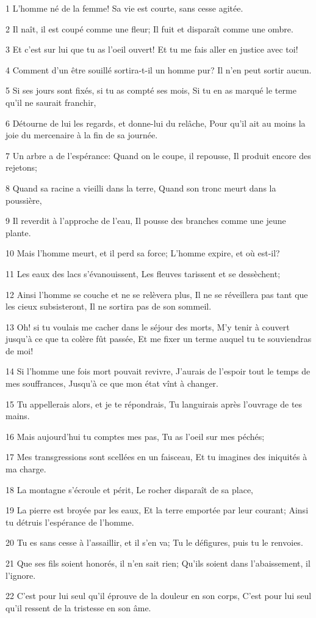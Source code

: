 \par 1 L'homme né de la femme! Sa vie est courte, sans cesse agitée.
\par 2 Il naît, il est coupé comme une fleur; Il fuit et disparaît comme une ombre.
\par 3 Et c'est sur lui que tu as l'oeil ouvert! Et tu me fais aller en justice avec toi!
\par 4 Comment d'un être souillé sortira-t-il un homme pur? Il n'en peut sortir aucun.
\par 5 Si ses jours sont fixés, si tu as compté ses mois, Si tu en as marqué le terme qu'il ne saurait franchir,
\par 6 Détourne de lui les regards, et donne-lui du relâche, Pour qu'il ait au moins la joie du mercenaire à la fin de sa journée.
\par 7 Un arbre a de l'espérance: Quand on le coupe, il repousse, Il produit encore des rejetons;
\par 8 Quand sa racine a vieilli dans la terre, Quand son tronc meurt dans la poussière,
\par 9 Il reverdit à l'approche de l'eau, Il pousse des branches comme une jeune plante.
\par 10 Mais l'homme meurt, et il perd sa force; L'homme expire, et où est-il?
\par 11 Les eaux des lacs s'évanouissent, Les fleuves tarissent et se dessèchent;
\par 12 Ainsi l'homme se couche et ne se relèvera plus, Il ne se réveillera pas tant que les cieux subsisteront, Il ne sortira pas de son sommeil.
\par 13 Oh! si tu voulais me cacher dans le séjour des morts, M'y tenir à couvert jusqu'à ce que ta colère fût passée, Et me fixer un terme auquel tu te souviendras de moi!
\par 14 Si l'homme une fois mort pouvait revivre, J'aurais de l'espoir tout le temps de mes souffrances, Jusqu'à ce que mon état vînt à changer.
\par 15 Tu appellerais alors, et je te répondrais, Tu languirais après l'ouvrage de tes mains.
\par 16 Mais aujourd'hui tu comptes mes pas, Tu as l'oeil sur mes péchés;
\par 17 Mes transgressions sont scellées en un faisceau, Et tu imagines des iniquités à ma charge.
\par 18 La montagne s'écroule et périt, Le rocher disparaît de sa place,
\par 19 La pierre est broyée par les eaux, Et la terre emportée par leur courant; Ainsi tu détruis l'espérance de l'homme.
\par 20 Tu es sans cesse à l'assaillir, et il s'en va; Tu le défigures, puis tu le renvoies.
\par 21 Que ses fils soient honorés, il n'en sait rien; Qu'ils soient dans l'abaissement, il l'ignore.
\par 22 C'est pour lui seul qu'il éprouve de la douleur en son corps, C'est pour lui seul qu'il ressent de la tristesse en son âme.

